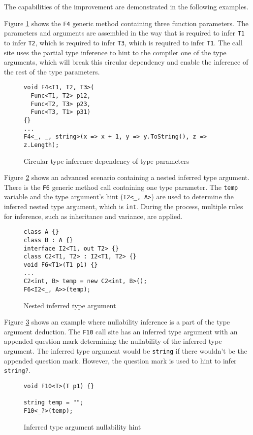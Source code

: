 The capabilities of the improvement are demonstrated in the following examples. 
\par
Figure \ref{img73:example1} shows the \texttt{F4} generic method containing three function parameters. 
The parameters and arguments are assembled in the way that is required to infer \texttt{T1} to infer \texttt{T2}, which is required to infer \texttt{T3}, which is required to infer \texttt{T1}. 
The call site uses the partial type inference to hint to the compiler one of the type arguments, which will break this circular dependency and enable the inference of the rest of the type parameters.
\begin{figure}[h]
\begin{lstlisting}[style=csharp, showstringspaces=false]
void F4<T1, T2, T3>(
  Func<T1, T2> p12, 
  Func<T2, T3> p23, 
  Func<T3, T1> p31) 
{}
...
F4<_, _, string>(x => x + 1, y => y.ToString(), z => z.Length); 
\end{lstlisting}
\caption{Circular type inference dependency of type parameters}
\label{img73:example1}
\end{figure}
\par
Figure \ref{img74:example2} shows an advanced scenario containing a nested inferred type argument.
There is the \texttt{F6} generic method call containing one type parameter.
The \texttt{temp} variable and the type argument’s hint (\texttt{I2<\_, A>}) are used to determine the inferred nested type argument, which is \texttt{int}.
During the process, multiple rules for inference, such as inheritance and variance, are applied.
\begin{figure}[h]
\begin{lstlisting}[style=csharp, showstringspaces=false]
class A {}
class B : A {}
interface I2<T1, out T2> {}
class C2<T1, T2> : I2<T1, T2> {}
void F6<T1>(T1 p1) {}
...
C2<int, B> temp = new C2<int, B>();
F6<I2<_, A>>(temp);
\end{lstlisting}
\caption{Nested inferred type argument}
\label{img74:example2}
\end{figure}
\par
Figure \ref{img75:example3} shows an example where nullability inference is a part of the type argument deduction.
The \texttt{F10} call site has an inferred type argument with an appended question mark determining the nullability of the inferred type argument. 
The inferred type argument would be \texttt{string} if there wouldn't be the appended question mark. 
However, the question mark is used to hint to infer \texttt{string?}.
\begin{figure}[h]
\begin{lstlisting}[style=csharp, showstringspaces=false]
void F10<T>(T p1) {}

string temp = "";
F10<_?>(temp);
\end{lstlisting}
\caption{Inferred type argument nullability hint}
\label{img75:example3}
\end{figure}
